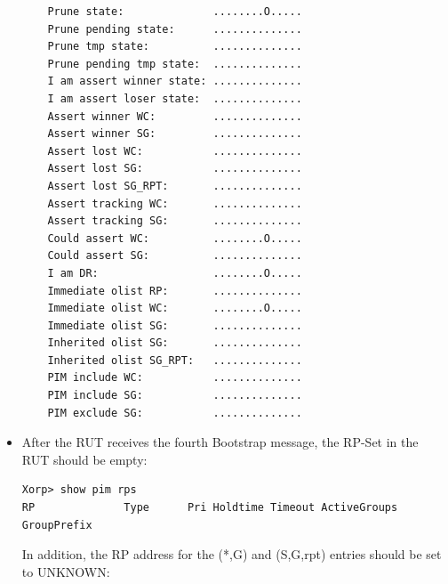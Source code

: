 \documentclass[11pt]{report}
\begin{document}
\begin{itemize}
\begin{verbatim}
    Prune state:              ........O.....
    Prune pending state:      ..............
    Prune tmp state:          ..............
    Prune pending tmp state:  ..............
    I am assert winner state: ..............
    I am assert loser state:  ..............
    Assert winner WC:         ..............
    Assert winner SG:         ..............
    Assert lost WC:           ..............
    Assert lost SG:           ..............
    Assert lost SG_RPT:       ..............
    Assert tracking WC:       ..............
    Assert tracking SG:       ..............
    Could assert WC:          ........O.....
    Could assert SG:          ..............
    I am DR:                  ........O.....
    Immediate olist RP:       ..............
    Immediate olist WC:       ........O.....
    Immediate olist SG:       ..............
    Inherited olist SG:       ..............
    Inherited olist SG_RPT:   ..............
    PIM include WC:           ..............
    PIM include SG:           ..............
    PIM exclude SG:           ..............
\end{verbatim}

  \item After the RUT receives the fourth Bootstrap message, the RP-Set in the
  RUT should be empty:

\begin{verbatim}
Xorp> show pim rps 
RP              Type      Pri Holdtime Timeout ActiveGroups GroupPrefix       
\end{verbatim}

  In addition, the RP address for the (*,G) and (S,G,rpt) entries should be
  set to UNKNOWN:


\end{itemize}
\end{document}
